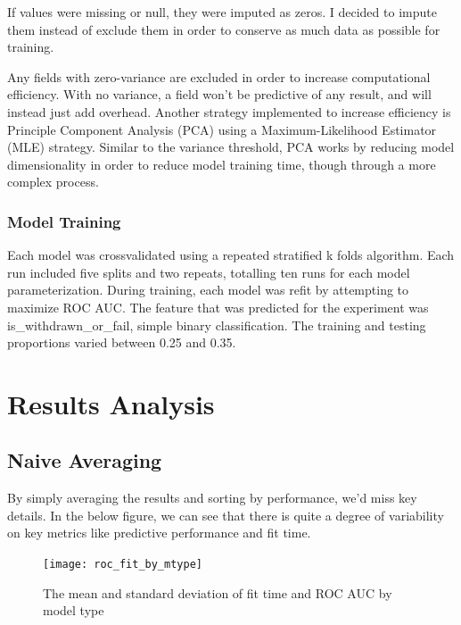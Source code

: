 \documentclass{article}
\begin{document}
                If values were missing or null, they were imputed as zeros.
                I decided to impute them instead of exclude them in order to conserve as much data as possible for training.
                
                Any fields with zero-variance are excluded in order to increase computational efficiency.
                With no variance, a field won't be predictive of any result, and will instead just add overhead.
                Another strategy implemented to increase efficiency is Principle Component Analysis (PCA) using a Maximum-Likelihood Estimator (MLE) strategy.
                Similar to the variance threshold, PCA works by reducing model dimensionality in order to reduce model training time, though through a more complex process. 
            
            \subsubsection{Model Training}
                Each model was crossvalidated using a repeated stratified k folds algorithm.
                Each run included five splits and two repeats, totalling ten runs for each model parameterization.
                During training, each model was refit by attempting to maximize ROC AUC.
                The feature that was predicted for the experiment was is\_withdrawn\_or\_fail, simple binary classification.
                The training and testing proportions varied between 0.25 and 0.35.


\section{Results Analysis}
    \subsection{Naive Averaging}
            By simply averaging the results and sorting by performance, we'd miss key details.
            In the below figure, we can see that there is quite a degree of variability on key metrics like predictive performance and fit time.
        \begin{figure}
            \centering
            \texttt{[image: roc\_fit\_by\_mtype]}
            \caption{The mean and standard deviation of fit time and ROC AUC by model type}
            \label{fig:roc_fit_by_mtype}
        \end{figure}
\end{document}
